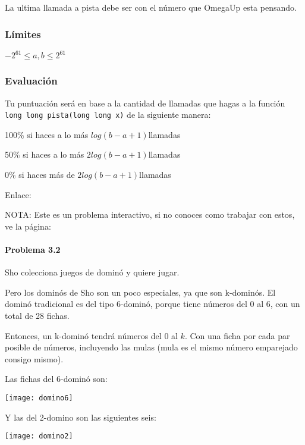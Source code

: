 La ultima llamada a pista debe ser con el número que OmegaUp esta pensando.

\subsubsection*{Límites}
\begin{plimits}
	\item \(-2^{61}\leq a,b \leq 2^{61}\)	
\end{plimits}
\subsubsection*{Evaluación}
Tu puntuación será en base a la cantidad de llamadas que hagas a la función \verb|long long pista(long long x)| de la siguiente manera:
\begin{plimits}
	\item 100\% si haces a lo más \(log(b-a+1)\)llamadas
	\item 50\% si haces a lo más \(2log(b-a+1)\)llamadas
	\item 0\% si haces más de \(2log(b-a+1)\)llamadas
\end{plimits}

Enlace: 

NOTA: Este es un problema interactivo, si no conoces como trabajar con estos, ve la página: \pageref{interactivos}

\problembreak

\paragraph{Problema 3.2} Sho colecciona juegos de dominó y quiere jugar.

Pero los dominós de Sho son un poco especiales, ya que son k-dominós. El dominó tradicional es del tipo 6-dominó, porque tiene números del \(0\) al \(6\), con un total de 28 fichas.

Entonces, un k-dominó tendrá números del \(0\) al \(k\). Con una ficha por cada par posible de números, incluyendo las mulas (mula es el mismo número emparejado consigo mismo).

Las fichas del 6-dominó son:

\begin{center}
		\texttt{[image: domino6]}
\end{center}

Y las del 2-domino son las siguientes seis:
\begin{center}
	\texttt{[image: domino2]}
\end{center}


